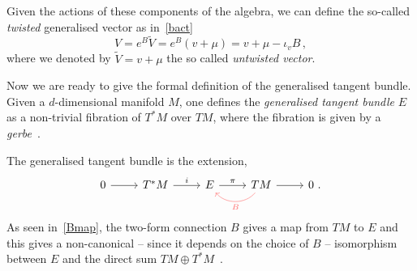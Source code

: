 \documentclass[debug]{phd}
\begin{document}
						Given the actions of these components of the algebra, we can define the so-called \emph{twisted} generalised vector as in~\eqref{bact}
								\begin{equation}\label{Btwist}
									V = e^{B} \tilde{V} = e^{B} (v + \mu) = v + \mu - \iota_v B \, ,
								\end{equation}
						where we denoted by $\tilde{V} = v + \mu$ the so called \emph{untwisted vector}.
	
						Now we are ready to give the formal definition of the generalised tangent bundle. Given a $d$-dimensional manifold $M$, one defines the \emph{generalised tangent bundle} $E$ as a non-trivial fibration of $T^*M$ over $TM$, where the fibration is given by a \emph{gerbe}~\cite{HitchinLagrangian}.

						The generalised tangent bundle is the extension,
								\begin{equation}\label{gentanext}
								\begin{tikzcd}
										0 \arrow{r} &T^*M \arrow{r}{i} & E \arrow{r}{\pi}& TM \arrow[bend left=50, color = red!60]{l}{B} \arrow{r}& 0 \ .
									\end{tikzcd}
								\end{equation}
					As seen in~\eqref{Bmap}, the two-form connection $B$ gives a map from $TM$ to $E$ and this gives a non-canonical -- since it depends on the choice of $B$ -- isomorphism between $E$ and the direct sum $TM \oplus T^*M$~\cite{Hatcher}.
					
\end{document}
